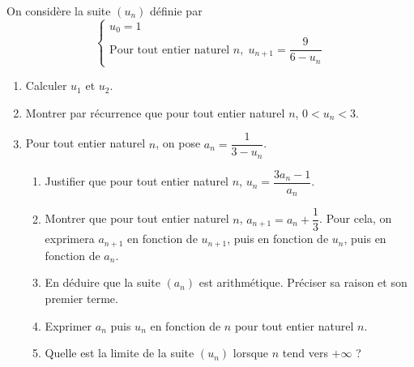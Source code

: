 \documentclass[11pt,fleqn]{book} %
\begin{document}
\begin{exercise}On considère la suite $(u_n)$ définie par
\[ \left\{ \begin{array}{l}
      u_0 = 1 \\
      \text{Pour tout entier naturel } n,\; u_{n+1}=\dfrac{9}{6-u_n}
\end{array}\right.\]

\begin{enumerate}
    \item Calculer $u_1$ et  $u_2$.
    \item Montrer par récurrence que pour tout entier naturel $n$, $0<u_n<3$.
    \item Pour tout entier naturel $n$, on pose $a_n=\dfrac{1}{3-u_n}$.
    \begin{enumerate}
        \item Justifier que pour tout entier naturel $n$, $u_n=\dfrac{3a_n-1}{a_n}$.
        \item Montrer que pour tout entier naturel $n$, $a_{n+1}=a_n+\dfrac{1}{3}$. Pour cela, on exprimera $a_{n+1}$ en fonction de $u_{n+1}$, puis en fonction de $u_n$, puis en fonction de $a_n$.
        \item En déduire que la suite $(a_n)$ est arithmétique. Préciser sa raison et son premier terme.
        \item Exprimer $a_n$ puis $u_n$ en fonction de $n$ pour tout entier naturel $n$.
        \item Quelle est la limite de la suite $(u_n)$ lorsque $n$ tend vers $+\infty$ ?
    \end{enumerate}
\end{enumerate}\end{exercise}
\end{document}
